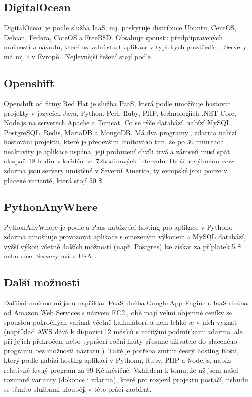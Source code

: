         \subsection{DigitalOcean}
        DigitalOcean je podle \cite{digitalocean1} služba IaaS, mj. poskytuje distribuce Ubuntu, CentOS, Debian, Fedora, CoreOS a FreeBSD. Obsahuje spoustu předpřipravených možností a návodů, které usnadní start aplikace v typických prostředích. Servery má mj. i v Evropě \cite{digitalocean2}. Nejlevnější řešení stojí podle \cite{digitalocean3}.
        
        \subsection{Openshift}
        Openshift od firmy Red Hat je služba PaaS, která podle \cite{openshift1} umožňuje hostovat projekty v jazycích Java, Python, Perl, Ruby, PHP, technologiích .NET Core, Node.js na serverech Apache a Tomcat. Co se týče databází, nabízí MySQL, PostgreSQL, Redis, MariaDB a MongoDB. Má dva programy \cite{openshift2}, zdarma nabízí hostování projektu, které je především limitováno tím, že po 30 minutách neaktivity je aplikace uspána, její probuzení chvíli trvá a zároveň musí spát alespoň 18 hodin v každém ze 72hodinových intervalů. Další nevýhodou verze zdarma jsou servery umístěné v Severní Americe, ty evropské jsou pouze v placené variantě, která stojí 50 \$.
        
        \subsection{PythonAnyWhere}
        PythonAnyWhere je podle \cite{pythonanywhere1} a \cite{pythonanywhere2} Paas nabízející hosting pro aplikace v Pythonu -- zdarma umožňuje provozovat aplikace s omezeným výkonem a MySQL databází, vyšší výkon včetně dalších možností (např. Postgres) lze získat za příplatek 5 \$ nebo více. Servery má v USA \cite{pythonanywhere3}.
        
        \subsection{Další možnosti}
        Dalšími možnostmi jsou například PaaS služba Google App Engine \cite{googleapp} a IaaS služba od Amazon Web Services s názvem EC2 \cite{aws1}, obě mají velmi objemné ceníky se spoustou pokročilých variant včetně kalkulátorů a není lehké se v nich vyznat (například AWS dává k dispozici 12 měsíců s určitými podmínkami zdarma, ale při jejich překročení nebo vypršení roční lhůty přesune uživatele do placeného programu bez možnosti návratu \cite{aws2}). Také je potřeba zmínit český hosting Roští, který podle \cite{rosti} nabízí hosting aplikací v Pythonu, Ruby, PHP a Node.js, nabízí relativně levný program za 99 Kč měsíčně. Vzhledem k tomu, že už jsem našel rozumné varianty (dokonce i zdarma), které pro rozjezd projektu postačí, nebudu se těmito službami hlouběji v této práci zaobírat.

